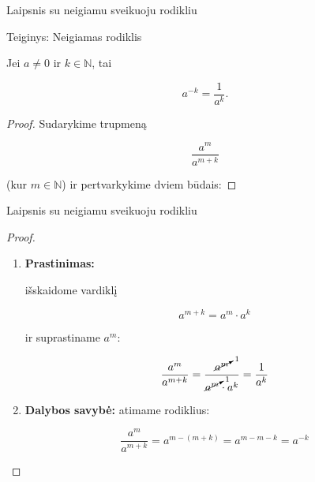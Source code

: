\documentclass[aspectratio=169,10pt]{beamer}
\newenvironment{proposition}[1][]%
{\begin{block}{Teiginys: #1}}%
{\end{block}}
\begin{document}

\begin{frame}{Laipsnis su neigiamu sveikuoju rodikliu}

    \begin{proposition}[Neigiamas rodiklis]

        Jei $a\neq0$ ir $k\in\mathbb{N}$, tai

        \[
        a^{-k}=\frac{1}{a^k}.
        \]

    \end{proposition}

    \begin{proof}

        Sudarykime trupmeną

        \[
        \frac{a^m}{a^{m+k}}
        \]

        (kur $m\in\mathbb{N}$)
        ir pertvarkykime dviem būdais:

    \end{proof}

\end{frame}

\begin{frame}{Laipsnis su neigiamu sveikuoju rodikliu}

    \begin{proof}

        \begin{enumerate}

            \item
            \textbf{Prastinimas:}

            išskaidome vardiklį

            \[
            a^{m+k}=a^m\cdot a^k
            \]

            ir suprastiname $a^m$:

            \[
            \frac{a^m}{a^{m+k}}
            =
            \frac{\cancelto{1}{a^m}}
            {\cancelto{1}{a^m}\cdot a^k}
            =
            \frac{1}{a^k}
            \]

            \item
            \textbf{Dalybos savybė:}
            atimame rodiklius:

            \[
            \frac{a^m}{a^{m+k}}
            =
            a^{m-(m+k)}
            =
            a^{m-m-k}
            =
            a^{-k}
            \]

        \end{enumerate}

    \end{proof}

\end{frame}
\end{document}
